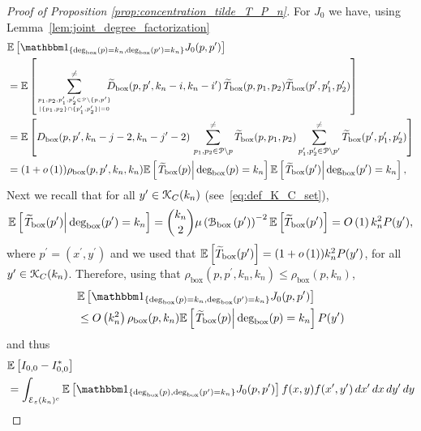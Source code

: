 \begin{proof}[Proof of Proposition \ref{prop:concentration_tilde_T_P_n}]
For $J_0$ we have, using Lemma~\ref{lem:joint_degree_factorization}
\begin{align*}
	&\Exp{\ind{\Dbox(p) = k_n, \Dbox(p^\prime) = k_n} J_0(p,p^\prime)}\\
	&= \Exp{\sum_{p_1, p_2, p_1^\prime, p_2^\prime \in \Pcal \setminus \{p,p^\prime\} 
		\atop |\{p_1, p_2\} \cap \{p_1^\prime, p_2^\prime\}| = 0}^{\ne}
		\hspace{-7pt} \widetilde{D}_{\text{box}}(p,p^\prime, k_n-i,k_n- i^\prime) \,
		\widetilde{T}_{\text{box}}(p,p_1,p_2) \widetilde{T}_{\text{box}}(p^\prime, p_1^\prime, p_2^\prime)}\\
	&= \Exp{D_{\text{box}}(p,p^\prime, k_n-j-2,k_n- j^\prime-2) \, \sum_{p_1,p_2 \in \Pcal \setminus p}^{\ne} 
		\widetilde{T}_{\text{box}}(p,p_1,p_2)
		\sum_{p_1^\prime,p_2^\prime \in \Pcal \setminus p^\prime}^{\ne} 
			\widetilde{T}_{\text{box}}(p^\prime,p_1^\prime,p_2^\prime)}\\
	&= (1+\smallO{1})\rho_{\text{box}}(p,p^\prime,k_n,k_n) \CExp{\widetilde{T}_{\text{box}}(p)}{\Dbox(p) = k_n}
		\CExp{\widetilde{T}_{\text{box}}(p^\prime)}{\Dbox(p^\prime) = k_n},
\end{align*}
Next we recall that for all $y^\prime \in {\mathcal K}_{C}(k_n)$ (see~\eqref{eq:def_K_C_set}), 
\[
	\mathbb{E}\left[\left.\widetilde{T}_{\text{box}}(p^\prime)\right|\text{deg}_{\text{box}}(p^\prime) = k_n\right] = \binom{k_n}{2} \mu\left({\mathcal B}_{\text{box}}\left(p^\prime\right)\right)^{-2} \mathbb{E}\left[\widetilde{T}_{\text{box}}(p^\prime)\right] = O\left(1\right)k_n^2 P(y^\prime),
\] 
where $p^\prime = (x^\prime, y^\prime)$ and we used that $\mathbb{E}\left[\widetilde{T}_{\text{box}}(p^\prime)\right] = (1+o\left(1\right)) k_n^2 P(y^\prime)$, for all $y^\prime \in {\mathcal K}_{C}(k_n)$. Therefore, using that $\rho_{\text{box}}(p,p^\prime,k_n,k_n) \le \rho_{\text{box}}(p,k_n)$,
\begin{align*}
	&\Exp{\ind{\Dbox(p) = k_n, \Dbox(p^\prime) = k_n} J_0(p,p^\prime)}\\
	&\le \bigO{k_n^2} \rho_{\text{box}}(p,k_n) \CExp{\widetilde{T}_{\text{box}}(p)}{\Dbox(p) = k_n} P(y^\prime)
\end{align*}
and thus
\begin{align*}
	&\Exp{I_{0,0} - I_{0,0}^\ast}\\
	&= \int_{\mathcal{E}_\varepsilon(k_n)^c}
		\Exp{\ind{\Dbox(p), \Dbox(p^\prime) = k_n} J_0(p,p^\prime)} f(x,y) f(x^\prime,y^\prime) \, dx^\prime \, dx \, dy^\prime \, dy\\

\end{align*}
\end{proof}
